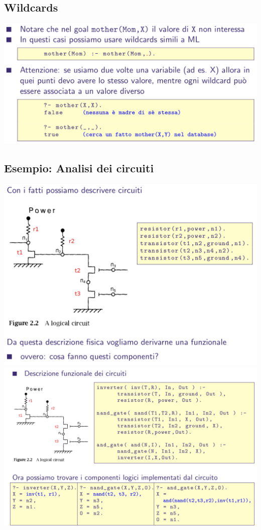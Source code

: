 \documentclass[10pt]{article}
\begin{document}
\subsection{Wildcards}
\includegraphics[scale=0.25]{Immagini/pl23.png}
\subsection{Esempio: Analisi dei circuiti}
\includegraphics[scale=0.25]{Immagini/pl24.png}
\\
\includegraphics[scale=0.25]{Immagini/pl25.png}
\end{document}
